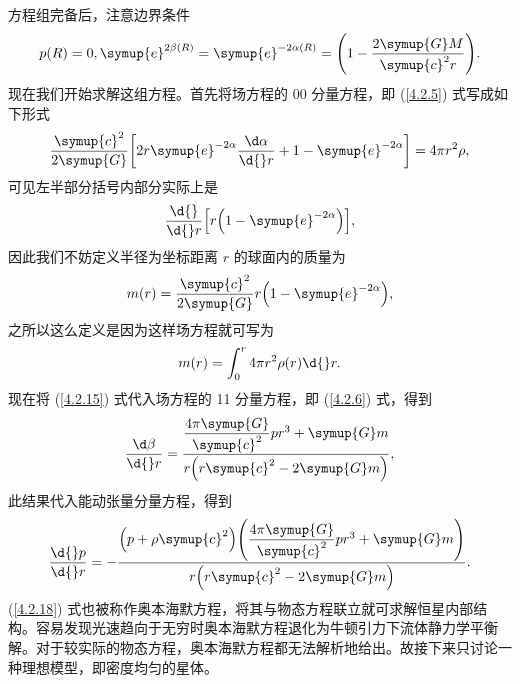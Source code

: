 \documentclass[UTF8, 12pt, a4paper, oneside, onecolumn, fontset=none]{ctexart}
\begin{document}
方程组完备后，注意边界条件
\begin{align}
p\mleft(R\mright)=0,\symup{e}^{2\beta\mleft(R\mright)}=\symup{e}^{-2\alpha\mleft(R\mright)}=\mleft(1-\frac{2\symup{G}M}{\symup{c}^{2}r}\mright).
\end{align}
现在我们开始求解这组方程。首先将场方程的 00 分量方程，即 (\ref{4.2.5}) 式写成如下形式
\begin{equation}
\frac{\symup{c}^{2}}{2\symup{G}}\mleft[2r\symup{e}^{-2\alpha}\frac{\d\alpha}{\d{}r}+1-\symup{e}^{-2\alpha}\mright]=4\pi r^{2}\rho,
\end{equation}
可见左半部分括号内部分实际上是
\begin{equation}
\frac{\d{}}{\d{}r}\mleft[r\mleft(1-\symup{e}^{-2\alpha}\mright)\mright],
\end{equation}
因此我们不妨定义半径为坐标距离 $r$ 的球面内的质量为
\begin{equation}
m\mleft(r\mright)=\frac{\symup{c}^{2}}{2\symup{G}}r\mleft(1-\symup{e}^{-2\alpha}\mright),\label{4.2.15}
\end{equation}
之所以这么定义是因为这样场方程就可写为
\begin{equation}
m\mleft(r\mright)=\int_{0}^{r}4\pi r^{2}\rho\mleft(r\mright)\d{}r.
\end{equation}
现在将 (\ref{4.2.15}) 式代入场方程的 11 分量方程，即 (\ref{4.2.6}) 式，得到
\begin{equation}
\frac{\d\beta}{\d{}r}=\frac{\dfrac{4\pi\symup{G}}{\symup{c}^{2}}pr^{3}+\symup{G}m}{r\mleft(r\symup{c}^{2}-2\symup{G}m\mright)},\label{4.2.17}
\end{equation}
此结果代入能动张量分量方程，得到
\begin{equation}
\frac{\d{}p}{\d{}r}=-\frac{\mleft(p+\rho \symup{c}^{2}\mright)\mleft(\dfrac{4\pi\symup{G}}{\symup{c}^{2}}pr^{3}+\symup{G}m\mright)}{r\mleft(r\symup{c}^{2}-2\symup{G}m\mright)}.\label{4.2.18}
\end{equation}
(\ref{4.2.18}) 式也被称作奥本海默方程，将其与物态方程联立就可求解恒星内部结构。容易发现光速趋向于无穷时奥本海默方程退化为牛顿引力下流体静力学平衡解。对于较实际的物态方程，奥本海默方程都无法解析地给出。故接下来只讨论一种理想模型，即密度均匀的星体。
\end{document}
